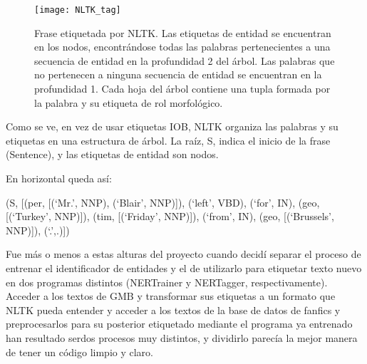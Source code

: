 \documentclass{pre-tfg}
\begin{document}
\begin{figure}[h]
	\label{fig:tags2}
	\texttt{[image: NLTK\_tag]}
	\caption{Frase etiquetada por NLTK. Las etiquetas de entidad se encuentran en los nodos, encontrándose todas las palabras pertenecientes a una secuencia de entidad en la profundidad 2 del árbol. Las palabras que no pertenecen a ninguna secuencia de entidad se encuentran en la profundidad 1. Cada hoja del árbol contiene una tupla formada por la palabra y su etiqueta de rol morfológico.}
	\centering
\end{figure}

Como se ve, en vez de usar etiquetas IOB, NLTK organiza las palabras y su etiquetas en una estructura de árbol. La raíz, S, indica el inicio de la frase (Sentence), y las etiquetas de entidad son nodos.

En horizontal queda así:

(S, [(per, [(‘Mr.’, NNP), (‘Blair’, NNP)]), (‘left’, VBD), (‘for’, IN), (geo, [(‘Turkey’, NNP)]), (tim, [(‘Friday’, NNP)]), (‘from’, IN), (geo, [(‘Brussels’, NNP)]), (‘.’,.)])

Fue más o menos a estas alturas del proyecto cuando decidí separar el proceso de entrenar el identificador de entidades y el de utilizarlo para etiquetar texto nuevo en dos programas distintos (NERTrainer y NERTagger, respectivamente). Acceder a los textos de GMB y transformar sus etiquetas a un formato que NLTK pueda entender y acceder a los textos de la base de datos de fanfics y preprocesarlos para su posterior etiquetado mediante el programa ya entrenado han resultado serdos procesos muy distintos, y dividirlo parecía la mejor manera de tener un código limpio y claro.

\end{document}
